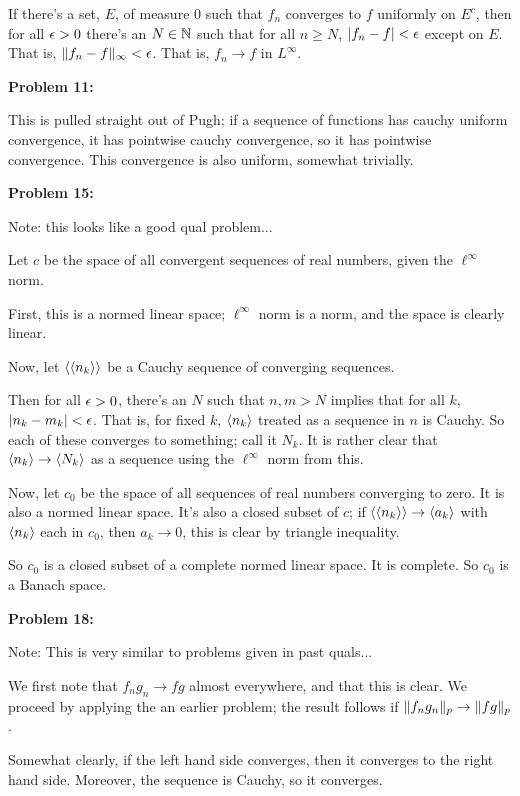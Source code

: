 \documentclass[a4paper,12pt]{article}
\begin{document}
If there's a set, $E$, of measure $0$ such that $f_n$ converges to $f$ uniformly on $E^c$, then for all $\epsilon>0$ there's an $N \in \mathbb{N}$ such that for all $n \geq N$, $\left\lvert f_n-f \right\rvert < \epsilon$ except on $E$. That is, $\|f_n-f\|_\infty < \epsilon$. That is, $f_n \to f$ in $L^\infty$.

\shunt

{\bf Problem 11:}

This is pulled straight out of Pugh; if a sequence of functions has cauchy uniform convergence, it has pointwise cauchy convergence, so it has pointwise convergence. This convergence is also uniform, somewhat trivially.

\shunt

{\bf Problem 15:}

Note: this looks like a good qual problem...

Let $c$ be the space of all convergent sequences of real numbers, given the $\ell^\infty$ norm.

First, this is a normed linear space; $\ell^\infty$ norm is a norm, and the space is clearly linear.

Now, let $\left\langle \left\langle n_k \right\rangle \right\rangle$ be a Cauchy sequence of converging sequences. 

Then for all $\epsilon>0$, there's an $N$ such that $n,m > N$ implies that for all $k$, $\left\lvert n_k-m_k \right\rvert < \epsilon$. That is, for fixed $k$, $\left\langle n_k \right\rangle$ treated as a sequence in $n$ is Cauchy. So each of these converges to something; call it $N_k$. It is rather clear that $\left\langle n_k \right\rangle \to \left\langle N_k \right\rangle$ as a sequence using the $\ell^\infty$ norm from this.

Now, let $c_0$ be the space of all sequences of real numbers converging to zero. It is also a normed linear space. It's also a closed subset of $c$; if $\left\langle \left\langle n_k \right\rangle \right\rangle \to \left\langle a_k \right\rangle$ with $\left\langle n_k \right\rangle$ each in $c_0$, then $a_k \to 0$, this is clear by triangle inequality.

So $c_0$ is a closed subset of a complete normed linear space. It is complete. So $c_0$ is a Banach space.

\shunt

{\bf Problem 18:}

Note: This is very similar to problems given in past quals...

We first note that $f_ng_n \to fg$ almost everywhere, and that this is clear. We proceed by applying the an earlier problem; the result follows if $\|f_ng_n\|_p \to \|fg\|_p$.

Somewhat clearly, if the left hand side converges, then it converges to the right hand side. Moreover, the sequence is Cauchy, so it converges. %
\end{document}
